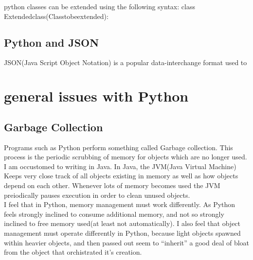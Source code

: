 python classes can be extended using the following syntax:
    class Extendedclass(Classtobeextended):

\subsection{Python and JSON}
JSON(Java Script Object Notation) is a popular data-interchange format used to


\section{general issues with Python}

\subsection{Garbage Collection}

Programs such as Python perform something called Garbage collection.  This process is the periodic scrubbing of memory for objects which are no longer used.\\
I am occustomed to writing in Java.  In Java, the JVM(Java Virtual Machine) Keeps very close track of all objects existing in memory as well as how objects depend on each other.  Whenever lots of memory becomes used the JVM preiodically pauses execution in order to clean unused objects.\\
I feel that in Python, memory management must work differently.  As Python feels strongly inclined to consume additional memory, and not so strongly inclined to free memory used(at least not automatically).  I also feel that object management must operate differently in Python, because light objects spawned within heavier objects, and then passed out seem to ``inherit'' a good deal of bloat from the object that orchistrated it's creation.

